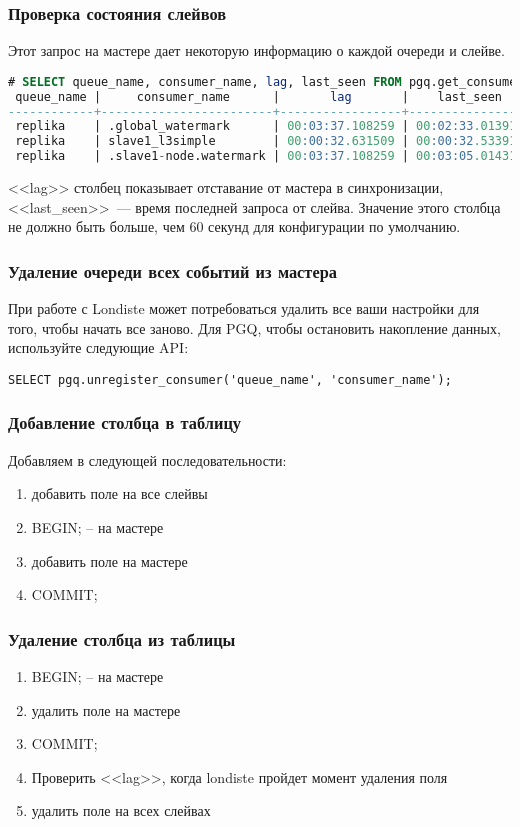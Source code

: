 \subsubsection{Проверка состояния слейвов}
Этот запрос на мастере дает некоторую информацию о каждой очереди и слейве.
\begin{lstlisting}[language=SQL,label=lst:londiste21,caption=Проверка состояния слейвов]
# SELECT queue_name, consumer_name, lag, last_seen FROM pgq.get_consumer_info();
 queue_name |     consumer_name      |       lag       |    last_seen
------------+------------------------+-----------------+-----------------
 replika    | .global_watermark      | 00:03:37.108259 | 00:02:33.013915
 replika    | slave1_l3simple        | 00:00:32.631509 | 00:00:32.533911
 replika    | .slave1-node.watermark | 00:03:37.108259 | 00:03:05.01431
\end{lstlisting}

<<lag>> столбец показывает отставание от мастера в синхронизации,
<<last\_seen>>~--- время последней запроса от слейва. Значение этого столбца не должно быть больше, чем 60 секунд для конфигурации по умолчанию.

\subsubsection{Удаление очереди всех событий из мастера}
При работе с Londiste может потребоваться удалить все ваши настройки для того, чтобы начать все заново. Для PGQ, чтобы остановить накопление данных, используйте следующие API:

\begin{lstlisting}[label=lst:londiste22,caption=Удаление очереди всех событий из мастера]
SELECT pgq.unregister_consumer('queue_name', 'consumer_name');
\end{lstlisting}

\subsubsection{Добавление столбца в таблицу}
Добавляем в следующей последовательности:
\begin{enumerate}
 \item добавить поле на все слейвы
 \item BEGIN; -- на мастере
 \item добавить поле на мастере
 \item COMMIT;
\end{enumerate}

\subsubsection{Удаление столбца из таблицы}
\begin{enumerate}
 \item BEGIN; -- на мастере
 \item удалить поле на мастере
 \item COMMIT;
 \item Проверить <<lag>>, когда londiste пройдет момент удаления поля
 \item удалить поле на всех слейвах
\end{enumerate}

